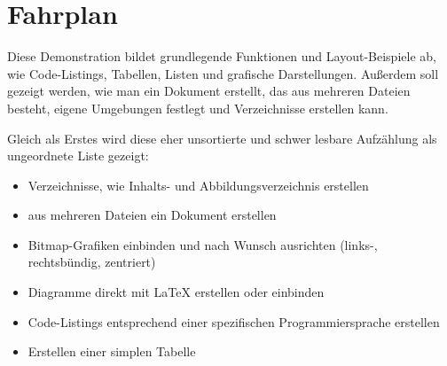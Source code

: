 \section{Fahrplan}

Diese Demonstration bildet grundlegende Funktionen und Layout-Beispiele ab, wie Code-Listings, Tabellen, Listen und grafische Darstellungen. Außerdem soll gezeigt werden, wie man ein Dokument erstellt, das aus mehreren Dateien besteht, eigene Umgebungen festlegt und Verzeichnisse erstellen kann.

Gleich als Erstes wird diese eher unsortierte und schwer lesbare Aufzählung als ungeordnete Liste gezeigt:

\begin{itemize}
	\item Verzeichnisse, wie Inhalts- und Abbildungsverzeichnis erstellen
	\item aus mehreren Dateien ein Dokument erstellen
	\item Bitmap-Grafiken einbinden und nach Wunsch ausrichten (links-, rechtsbündig, zentriert)
	\item Diagramme direkt mit LaTeX erstellen oder einbinden
	\item Code-Listings entsprechend einer spezifischen Programmiersprache erstellen
	\item Erstellen einer simplen Tabelle
\end{itemize}